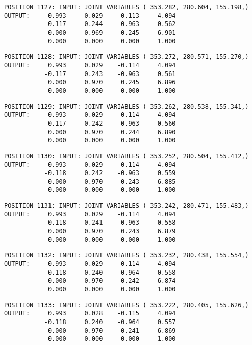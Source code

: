 \begin{verbatim}
POSITION 1127: INPUT: JOINT VARIABLES ( 353.282, 280.604, 155.198,)
OUTPUT:     0.993     0.029    -0.113     4.094
           -0.117     0.244    -0.963     0.562
            0.000     0.969     0.245     6.901
            0.000     0.000     0.000     1.000
\end{verbatim} \pagebreak[1]\begin{verbatim}
POSITION 1128: INPUT: JOINT VARIABLES ( 353.272, 280.571, 155.270,)
OUTPUT:     0.993     0.029    -0.114     4.094
           -0.117     0.243    -0.963     0.561
            0.000     0.970     0.245     6.896
            0.000     0.000     0.000     1.000
\end{verbatim} \pagebreak[1]\begin{verbatim}
POSITION 1129: INPUT: JOINT VARIABLES ( 353.262, 280.538, 155.341,)
OUTPUT:     0.993     0.029    -0.114     4.094
           -0.117     0.242    -0.963     0.560
            0.000     0.970     0.244     6.890
            0.000     0.000     0.000     1.000
\end{verbatim} \pagebreak[1]\begin{verbatim}
POSITION 1130: INPUT: JOINT VARIABLES ( 353.252, 280.504, 155.412,)
OUTPUT:     0.993     0.029    -0.114     4.094
           -0.118     0.242    -0.963     0.559
            0.000     0.970     0.243     6.885
            0.000     0.000     0.000     1.000
\end{verbatim} \pagebreak[1]\begin{verbatim}
POSITION 1131: INPUT: JOINT VARIABLES ( 353.242, 280.471, 155.483,)
OUTPUT:     0.993     0.029    -0.114     4.094
           -0.118     0.241    -0.963     0.558
            0.000     0.970     0.243     6.879
            0.000     0.000     0.000     1.000
\end{verbatim} \pagebreak[1]\begin{verbatim}
POSITION 1132: INPUT: JOINT VARIABLES ( 353.232, 280.438, 155.554,)
OUTPUT:     0.993     0.029    -0.114     4.094
           -0.118     0.240    -0.964     0.558
            0.000     0.970     0.242     6.874
            0.000     0.000     0.000     1.000
\end{verbatim} \pagebreak[1]\begin{verbatim}
POSITION 1133: INPUT: JOINT VARIABLES ( 353.222, 280.405, 155.626,)
OUTPUT:     0.993     0.028    -0.115     4.094
           -0.118     0.240    -0.964     0.557
            0.000     0.970     0.241     6.869
            0.000     0.000     0.000     1.000
\end{verbatim} \pagebreak[1]\begin{verbatim}

\end{verbatim}
